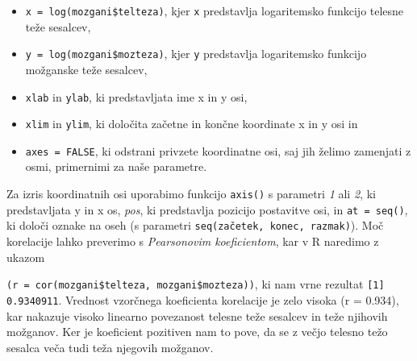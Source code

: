 \begin{itemize}
    \item \verb|x = log(mozgani$telteza)|, kjer \verb|x| predstavlja logaritemsko funkcijo telesne teže sesalcev,
    \item \verb|y = log(mozgani$mozteza)|, kjer \verb|y| predstavlja logaritemsko funkcijo možganske teže sesalcev,
    \item \verb|xlab| in \verb|ylab|, ki predstavljata ime x in y osi,
    \item \verb|xlim| in \verb|ylim|, ki določita začetne in končne koordinate x in y osi in
    \item \verb|axes = FALSE|, ki odstrani privzete koordinatne osi, saj jih želimo zamenjati z osmi, primernimi za
    naše parametre.
\end{itemize}

\noindent
Za izris koordinatnih osi uporabimo funkcijo \verb|axis()| s parametri \emph{1} ali \emph{2}, ki predstavljata
y in x os, \emph{pos}, ki predstavlja pozicijo postavitve osi, in \verb|at = seq()|, ki določi oznake na oseh
(s parametri \verb|seq(začetek, konec, razmak)|).
Moč korelacije lahko preverimo s \emph{Pearsonovim koeficientom}, kar v R naredimo z ukazom

\noindent
\verb|(r = cor(mozgani$telteza, mozgani$mozteza))|\label{en:r}, ki nam vrne rezultat \verb|[1] 0.9340911|.
Vrednost vzorčnega koeficienta korelacije je zelo visoka (r = 0.934), kar nakazuje visoko linearno povezanost
telesne teže sesalcev in teže njihovih možganov.
Ker je koeficient pozitiven nam to pove, da se z večjo telesno težo sesalca veča tudi teža njegovih možganov.